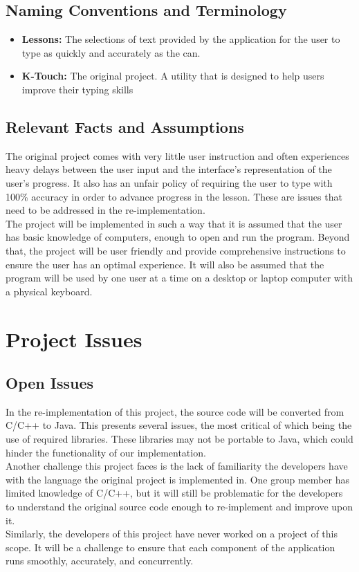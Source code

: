 \documentclass{article}
\begin{document}
\subsection{Naming Conventions and Terminology}
\begin{itemize}
    \item \textbf{Lessons:} The selections of text provided by the application for the user to type as quickly and accurately as the can.
    \item \textbf{K-Touch:} The original project. A utility that is designed to help users improve their typing skills
\end{itemize}

\subsection{Relevant Facts and Assumptions}
\indent \indent The original project comes with very little user instruction and often experiences heavy delays between the user input and the interface's representation of the user's progress. It also has an unfair policy of requiring the user to type with 100\% accuracy in order to advance progress in the lesson. These are issues that need to be addressed in the re-implementation.
\\
\indent The project will be implemented in such a way that it is assumed that the user has basic knowledge of computers, enough to open and run the program. Beyond that, the project will be user friendly and provide comprehensive instructions to ensure the user has an optimal experience. It will also be assumed that the program will be used by one user at a time on a desktop or laptop computer with a physical keyboard.

\section{Project Issues}
\subsection{Open Issues}
\indent \indent In the re-implementation of this project, the source code will be converted from C/C++ to Java. This presents several issues, the most critical of which being the use of required libraries. These libraries may not be portable to Java, which could hinder the functionality of our implementation. 
\\
\indent Another challenge this project faces is the lack of familiarity the developers have with the language the original project is implemented in. One group member has limited knowledge of C/C++, but it will still be problematic for the developers to understand the original source code enough to re-implement and improve upon it.
\\
\indent Similarly, the developers of this project have never worked on a project of this scope. It will be a challenge to ensure that each component of the application runs smoothly, accurately, and concurrently.
\end{document}

